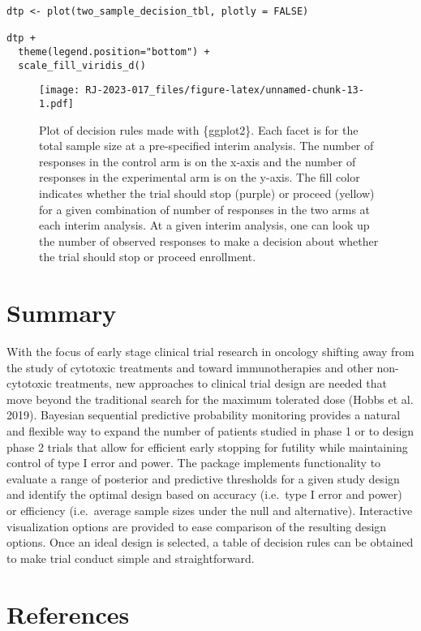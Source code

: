 \begin{verbatim}
dtp <- plot(two_sample_decision_tbl, plotly = FALSE)

dtp + 
  theme(legend.position="bottom") + 
  scale_fill_viridis_d()
\end{verbatim}

\begin{figure}
\centering
\texttt{[image: RJ-2023-017\_files/figure-latex/unnamed-chunk-13-1.pdf]}
\caption{\label{fig:unnamed-chunk-13}Plot of decision rules made with \{ggplot2\}. Each facet is for the total sample size at a pre-specified interim analysis. The number of responses in the control arm is on the x-axis and the number of responses in the experimental arm is on the y-axis. The fill color indicates whether the trial should stop (purple) or proceed (yellow) for a given combination of number of responses in the two arms at each interim analysis. At a given interim analysis, one can look up the number of observed responses to make a decision about whether the trial should stop or proceed enrollment.}
\end{figure}

\hypertarget{summary}{%
\section{Summary}\label{summary}}

With the focus of early stage clinical trial research in oncology shifting away from the study of cytotoxic treatments and toward immunotherapies and other non-cytotoxic treatments, new approaches to clinical trial design are needed that move beyond the traditional search for the maximum tolerated dose (Hobbs et al. 2019). Bayesian sequential predictive probability monitoring provides a natural and flexible way to expand the number of patients studied in phase 1 or to design phase 2 trials that allow for efficient early stopping for futility while maintaining control of type I error and power. The  package implements functionality to evaluate a range of posterior and predictive thresholds for a given study design and identify the optimal design based on accuracy (i.e.~type I error and power) or efficiency (i.e.~average sample sizes under the null and alternative). Interactive visualization options are provided to ease comparison of the resulting design options. Once an ideal design is selected, a table of decision rules can be obtained to make trial conduct simple and straightforward.

\hypertarget{references}{%
\section*{References}\label{references}}

